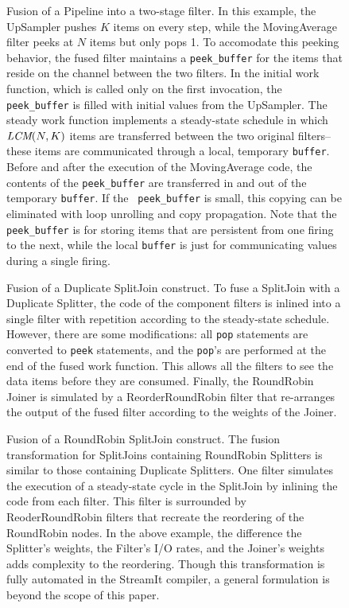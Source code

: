 \begin{figure}
\centering
{}
\vspace{-6pt}
\caption{\protect\small Fusion of a Pipeline into a two-stage filter.
In this example, the UpSampler pushes $K$ items on every step, while the
MovingAverage filter peeks at $N$ items but only pops 1.  To accomodate
this peeking behavior, the fused filter maintains a {\tt peek\_buffer}
for the items that reside on the channel between the two filters.  In
the initial work function, which is called only on the first
invocation, the {\tt peek\_buffer} is filled with initial values from
the UpSampler.  The steady work function implements a steady-state
schedule in which $\mbox{\it LCM}(N, K)$ items are transferred between the two
original filters--these items are communicated through a local,
temporary {\tt buffer}.  Before and after the execution of the
MovingAverage code, the contents of the {\tt peek\_buffer} are
transferred in and out of the temporary {\tt buffer}.  If the {\tt
peek\_buffer} is small, this copying can be eliminated with loop
unrolling and copy propagation.  Note that the {\tt peek\_buffer} is
for storing items that are persistent from one firing to the next,
while the local {\tt buffer} is just for communicating values during a
single firing. \label{fig:fuse-pipe}}
\vspace{-6pt}
\end{figure}

\begin{figure}
\centering
{}
\caption{\protect\small Fusion of a Duplicate SplitJoin construct.  To
fuse a SplitJoin with a Duplicate Splitter, the code of the component
filters is inlined into a single filter with repetition according to
the steady-state schedule.  However, there are some modifications: all
{\tt pop} statements are converted to {\tt peek} statements, and the
{\tt pop}'s are performed at the end of the fused work function.  This
allows all the filters to see the data items before they are consumed.
Finally, the RoundRobin Joiner is simulated by a ReorderRoundRobin
filter that re-arranges the output of the fused filter according to
the weights of the Joiner.  \protect\label{fig:fuse-splitjoin1}}
\vspace{-6pt}
\end{figure}

\begin{figure}
\centering
{}
\caption{\protect\small Fusion of a RoundRobin SplitJoin construct.
The fusion transformation for SplitJoins containing RoundRobin
Splitters is similar to those containing Duplicate Splitters.  One
filter simulates the execution of a steady-state cycle in the
SplitJoin by inlining the code from each filter.  This filter is
surrounded by ReoderRoundRobin filters that recreate the reordering of
the RoundRobin nodes.  In the above example, the difference the
Splitter's weights, the Filter's I/O rates, and the Joiner's weights
adds complexity to the reordering.  Though this transformation is
fully automated in the StreamIt compiler, a general formulation is
beyond the scope of this paper.  \protect\label{fig:fuse-splitjoin2}}
\end{figure}

